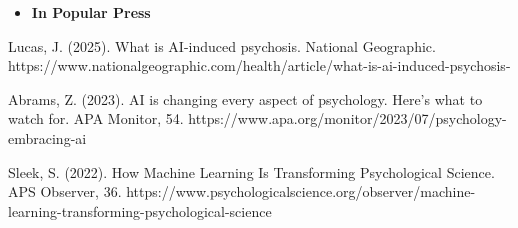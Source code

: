 \documentclass[letterpaper,10pt]{article}
\begin{document}
\begin{itemize}
	\vspace{3mm}
	
	\item {\textbf{\large{In Popular Press}}}
\end{itemize}
\begin{etaremune}
	\item Lucas, J. (2025). What is AI-induced psychosis. National Geographic. https://www.nationalgeographic.com/health/article/what-is-ai-induced-psychosis-
	
	\item Abrams, Z. (2023). AI is changing every aspect of psychology. Here’s what to watch for. APA Monitor, 54. https://www.apa.org/monitor/2023/07/psychology-embracing-ai
	
	\item Sleek, S. (2022). How Machine Learning Is Transforming Psychological Science. APS Observer, 36. https://www.psychologicalscience.org/observer/machine-learning-transforming-psychological-science
	\vspace{3mm}
	
	
\end{etaremune}
\end{document}
